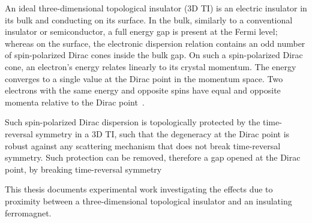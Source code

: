 An ideal three-dimensional topological insulator (3D TI) is an electric insulator in its bulk and conducting on its surface. In the bulk, similarly to a conventional insulator or semiconductor, a full energy gap is present at the Fermi level; whereas on the surface, the electronic dispersion relation contains an odd number of spin-polarized Dirac cones inside the bulk gap. On such a spin-polarized Dirac cone, an electron's energy relates linearly to its crystal momentum. The energy converges to a single value at the Dirac point in the momentum space. Two electrons with the same energy and opposite spins have equal and opposite momenta relative to the Dirac point~\cite{TI_Qi, TI_Col}.

Such spin-polarized Dirac dispersion is topologically protected by the time-reversal symmetry in a 3D TI, such that the degeneracy at the Dirac point is robust against any scattering mechanism that does not break time-reversal symmetry. Such protection can be removed, therefore a gap opened at the Dirac point, by breaking time-reversal symmetry

This thesis documents experimental work investigating the effects due to proximity between a three-dimensional topological insulator and an insulating ferromagnet.